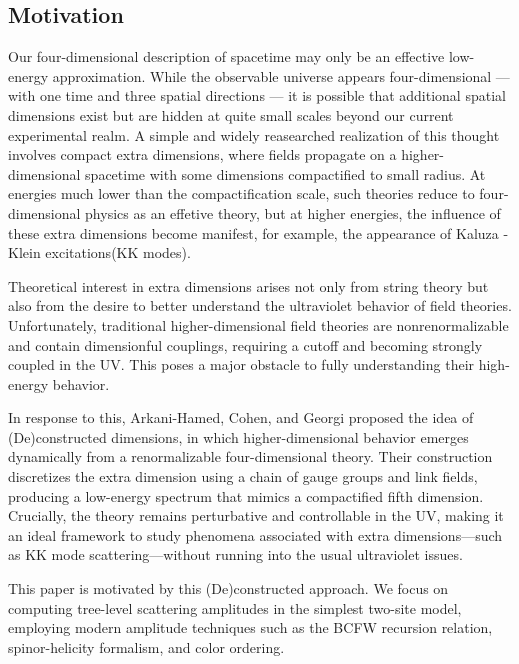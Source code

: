 \documentclass[12pt]{article}
\numberwithin{equation}{section}
\begin{document}
\subsection{Motivation}
Our four-dimensional description of spacetime may only be an effective low-energy approximation. While the observable universe appears four-dimensional — with one time and three spatial directions — it is possible that additional spatial dimensions exist but are hidden at quite small scales beyond our current experimental realm. A simple and widely reasearched realization of this thought involves compact extra dimensions, where fields propagate on a higher-dimensional spacetime with some dimensions compactified to small radius. At energies much lower than the compactification scale, such theories reduce to four-dimensional physics as an effetive theory, but at higher energies, the influence of these extra dimensions become manifest, for example, the appearance of Kaluza - Klein excitations(KK modes).

Theoretical interest in extra dimensions arises not only from string theory but also from the desire to better understand the ultraviolet behavior of field theories. Unfortunately, traditional higher-dimensional field theories are nonrenormalizable and contain dimensionful couplings, requiring a cutoff and becoming strongly coupled in the UV. This poses a major obstacle to fully understanding their high-energy behavior.

In response to this, Arkani-Hamed, Cohen, and Georgi proposed the idea of (De)constructed dimensions, in which higher-dimensional behavior emerges dynamically from a renormalizable four-dimensional theory. Their construction discretizes the extra dimension using a chain of gauge groups and link fields, producing a low-energy spectrum that mimics a compactified fifth dimension. Crucially, the theory remains perturbative and controllable in the UV, making it an ideal framework to study phenomena associated with extra dimensions—such as KK mode scattering—without running into the usual ultraviolet issues.

This paper is motivated by this (De)constructed approach. We focus on computing tree-level scattering amplitudes in the simplest two-site model, employing modern amplitude techniques such as the BCFW recursion relation, spinor-helicity formalism, and color ordering.
\end{document}
